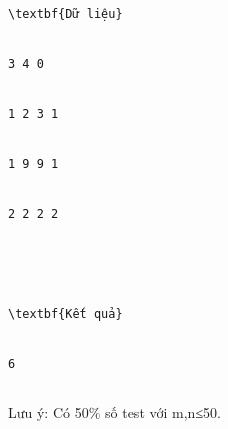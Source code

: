 \begin{verbatim}
\textbf{Dữ liệu}


3 4 0


1 2 3 1


1 9 9 1


2 2 2 2	





\textbf{Kết quả}


6


\end{verbatim}

   Lưu ý: Có 50\% số test với m,n≤50.